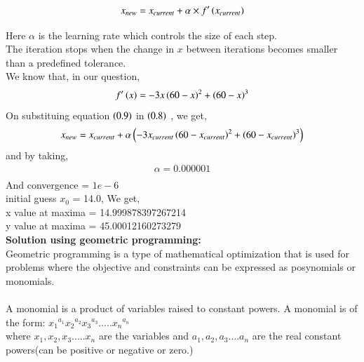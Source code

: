 \documentclass[journal]{IEEEtran}
\begin{document}
\begin{align}
    x_{new} = x_{current} + \alpha \times f^\prime\left(x_{current}\right)
\end{align}

Here $\alpha$ is the learning rate which controls the size of each step.\\
The iteration stops when the change in $x$ between iterations becomes smaller than a predefined tolerance.\\
We know that, in our question,
\begin{align}
    f^\prime \left(x\right) = -3x\left(60-x\right)^2 + \left(60-x\right)^3
\end{align}
On substituing equation $\left(0.9\right)$ in $\left(0.8\right)$ , we get,
\begin{align}
    x_{new} = x_{current} + \alpha\left(-3x_{current}\left(60-x_{current}\right)^2 + \left(60-x_{current}\right)^3\right)
\end{align}
and by taking,
\begin{align}
    \alpha = 0.000001\\
\end{align}
And convergence = $1e-6$\\
initial guess $x_0$ = 14.0,
We get,\\
x value at maxima =  14.999878397267214\\
y value at maxima =  45.00012160273279 \\ 
 \textbf{Solution using geometric programming:}\\
Geometric programming is a type of mathematical optimization that is used for problems where the objective and constraints can be expressed as posynomials or monomials.\\
\\ A monomial is a product of variables raised to constant powers. A monomial is of the form:
${x_1}^{a_1}{x_2}^{a_2}{x_3}^{a_3}.....{x_n}^{a_n}$\\
where $x_1,x_2,x_3.....x_n$ are the variables and $a_1,a_2,a_3....a_n$ are the real constant powers(can be positive or negative or zero.)\\
\end{document}
